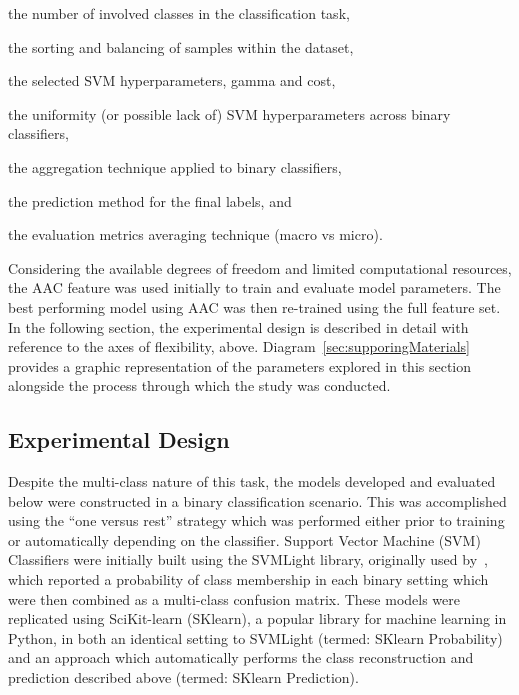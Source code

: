 \begin{enumerate}
\item the number of involved classes in the classification task,
\item the sorting and balancing of samples within the dataset,
\item the selected SVM hyperparameters, gamma and cost,
\item the uniformity (or possible lack of) SVM hyperparameters across binary classifiers,
\item the aggregation technique applied to binary classifiers,
\item the prediction method for the final labels, and\\
{\item the evaluation metrics averaging technique (macro vs micro).}
\end{enumerate}

Considering the available degrees of freedom and limited computational resources, the AAC feature was used initially
to train and evaluate model parameters. The best performing model using AAC was then re-trained using the full feature
set. In the following section, the experimental design is described in detail with reference to the axes of flexibility,
above. Diagram~\ref{sec:supporingMaterials} provides a graphic representation of the parameters explored in this
section alongside the process through which the study was conducted.

\subsection{Experimental Design}
\label{sec:experimentaldesign}
Despite the multi-class nature of this task, the models developed and evaluated below were constructed in a binary
classification scenario. This was accomplished using the ``one versus rest'' strategy which was performed either prior
to training or automatically depending on the classifier. Support Vector Machine (SVM) Classifiers were initially built
using the SVMLight library, originally used by~\cite{mishra2014prediction}, which reported a probability of class
membership in each binary setting which were then combined as a multi-class confusion matrix. These models were
replicated using SciKit-learn (SKlearn), a popular library for machine learning in Python, in both an identical setting
to SVMLight (termed: SKlearn Probability) and an approach which automatically performs the class reconstruction and
prediction described above (termed: SKlearn Prediction).

